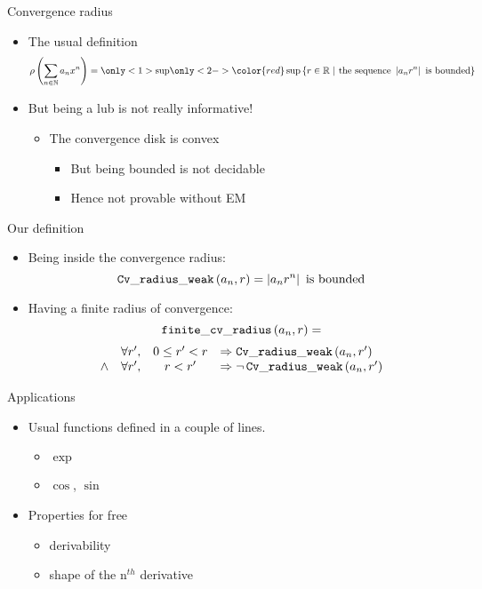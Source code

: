 \documentclass{beamer}
\begin{document}
\begin{frame}{Convergence radius}
\begin{itemize}
  \item The usual definition
    $$\rho\left(\sum_{n \in \N} a_n x^n\right) = \only<1>{\sup}
    \only<2->{{\color{red} \sup }} \left\lbrace
     r \in \R ~|~\text{the sequence } \left|a_n r^n\right|
     \text{ is bounded}\right\rbrace$$
  \item<2-> But being a lub is not really informative!
  \begin{itemize}
    \item<3-> The convergence disk is convex
    \begin{itemize}
      \item<4-> But being bounded is not decidable
      \item<5-> Hence not provable without EM
    \end{itemize}
  \end{itemize}
\end{itemize}
\end{frame}

\begin{frame}{Our definition}
\begin{itemize}
  \item Being inside the convergence radius:
  $$\operatorname{\mathtt{Cv\_radius\_weak}}{}(a_n,r) = \left| a_n r^n \right| \text{ is bounded}$$
  \item Having a finite radius of convergence:
  $$\operatorname{\mathtt{finite\_cv\_radius}}{}(a_n,r) =$$
  $$\begin{array}{clcl}
    & \forall r', & 0 \le r' < r & \Rightarrow \operatorname{\mathtt{Cv\_radius\_weak}}{}(a_n,r') \\
    \wedge & \forall r', & r < r' & \Rightarrow \neg \operatorname{\mathtt{Cv\_radius\_weak}}{}(a_n,r')
    \end{array}$$
\end{itemize}
\end{frame}

\begin{frame}{Applications}
\begin{itemize}
 \item Usual functions defined in a couple of lines.
  \begin{itemize}
     \item $\exp$
     \item $\cos$, $\sin$
  \end{itemize}
 \item Properties for free
  \begin{itemize}
    \item derivability
    \item shape of the n$^{th}$ derivative
  \end{itemize}
\end{itemize}
\end{frame}
\end{document}
